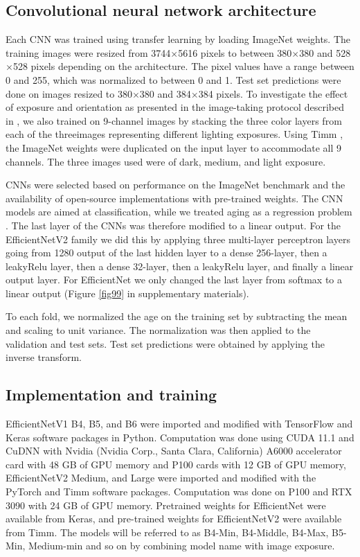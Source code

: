\documentclass[10pt,letterpaper]{article}
\begin{document}
\subsection{Convolutional neural network architecture}


Each CNN was trained using transfer learning by loading ImageNet weights. The training images were resized from 3744$\times$5616 pixels to between 380$\times$380 and 528$\times$528 pixels
depending on the architecture. The pixel values have a range between 0 and 255, which was normalized to between 0 and 1. Test set predictions were done on images resized to 380$\times$380 and 384$\times$384 pixels. To investigate the effect of exposure and orientation as presented in the image-taking protocol described in \citep{codOtolithsMyers}, we also trained on 9-channel images by stacking the three color layers from each of the threeimages representing different lighting exposures. Using Timm \citep{rw2019timm}, the ImageNet weights were duplicated on the input layer to accommodate all 9 channels. The three images used were of dark, medium, and light exposure. 

CNNs were selected based on performance on the ImageNet benchmark and the availability of open-source implementations with pre-trained weights. The CNN models are aimed at classification, while we treated aging as a regression problem \citep{moenetal, vaboeetal}. The last layer of the CNNs was therefore modified to  a linear output. For the EfficientNetV2 family we did this by applying three multi-layer perceptron layers going from 1280 output of the last hidden layer to a dense 256-layer, 
then a leakyRelu \citep{DBLP:journals/corr/XuWCL15} layer, then a dense 32-layer, then a leakyRelu layer, and finally a linear output layer. For EfficientNet we only changed the last layer from softmax to a linear output (Figure \ref{fig99} in supplementary materials).

To each fold, we normalized the age on the training set by subtracting the mean and scaling to unit variance. The normalization was then applied to the validation and test sets. Test set predictions were obtained by applying the inverse transform.

\subsection{Implementation and training}

EfficientNetV1 B4, B5, and B6 were imported and modified with TensorFlow \citep{abadi2016tensorflow} and Keras \citep{keras} software packages in Python. Computation was done using CUDA 11.1 and CuDNN with Nvidia (Nvidia Corp., Santa Clara, California) A6000 accelerator card with 48 GB of GPU memory and P100 cards with 12 GB of GPU memory,
EfficientNetV2 Medium, and Large were imported and modified with the PyTorch \citep{NEURIPS2019_9015}  and Timm \citep{rw2019timm} software packages. Computation was done on P100 and RTX 3090 with 24 GB of GPU memory. Pretrained weights for EfficientNet were available from Keras, and pre-trained weights for EfficientNetV2 were available from Timm. The models will be referred to as B4-Min, B4-Middle, B4-Max, B5-Min, Medium-min and so on by combining model name with image exposure.
\end{document}
